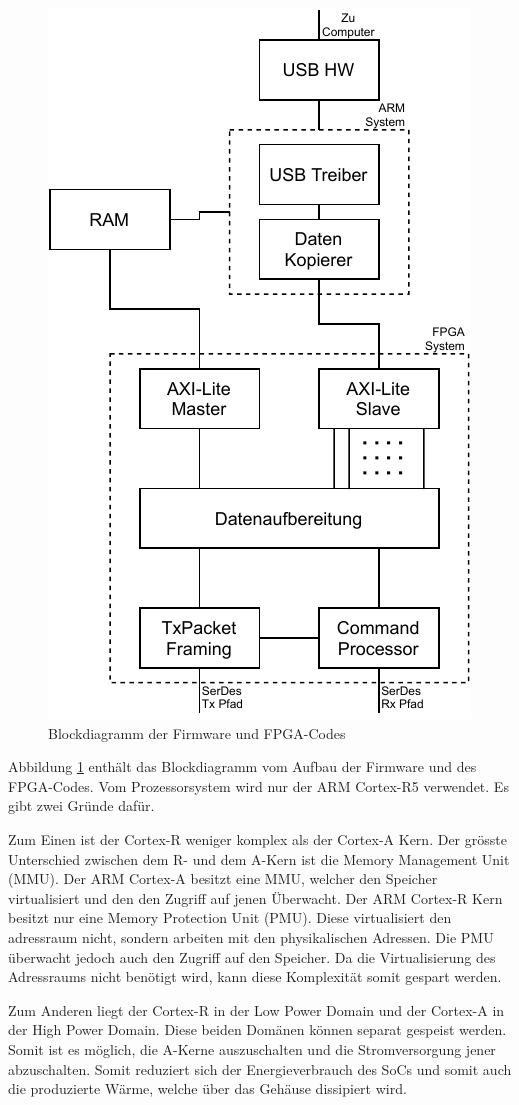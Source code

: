 \documentclass{article}
\begin{document}
\begin{figure}[tb]
    \includegraphics[width=0.6\linewidth]{drawio/bd_firmware}
    \caption{Blockdiagramm der Firmware und FPGA-Codes}
    \label{fig:bd_firmware}
\end{figure}

Abbildung \ref{fig:bd_firmware} enthält das Blockdiagramm vom Aufbau der Firmware und des FPGA-Codes. Vom Prozessorsystem wird nur der ARM Cortex-R5 verwendet. Es gibt zwei Gründe dafür. 

Zum Einen ist der Cortex-R weniger komplex als der Cortex-A Kern. Der grösste Unterschied zwischen dem R- und dem A-Kern ist die Memory Management Unit (MMU). Der ARM Cortex-A besitzt eine MMU, welcher den Speicher virtualisiert und den den Zugriff auf jenen Überwacht. Der ARM Cortex-R Kern besitzt nur eine Memory Protection Unit (PMU). Diese virtualisiert den adressraum nicht, sondern arbeiten mit den physikalischen Adressen. Die PMU überwacht jedoch auch den Zugriff auf den Speicher. Da die Virtualisierung des Adressraums nicht benötigt wird, kann diese Komplexität somit gespart werden. 

Zum Anderen liegt der Cortex-R in der Low Power Domain und der Cortex-A in der High Power Domain. Diese beiden Domänen können separat gespeist werden. Somit ist es möglich, die A-Kerne auszuschalten und die Stromversorgung jener abzuschalten. Somit reduziert sich der Energieverbrauch des SoCs und somit auch die produzierte Wärme, welche über das Gehäuse dis­si­pie­rt wird.
\end{document}
